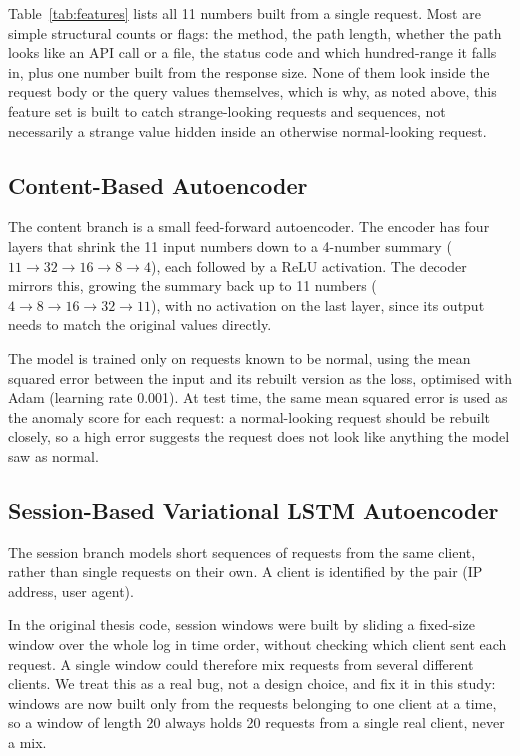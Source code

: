 \documentclass[futureinternet,article,submit,moreauthors]{Definitions/mdpi}
\begin{document}
Table~\ref{tab:features} lists all 11 numbers built from a single request. Most are simple structural counts or flags: the method, the path length, whether the path looks like an API call or a file, the status code and which hundred-range it falls in, plus one number built from the response size. None of them look inside the request body or the query values themselves, which is why, as noted above, this feature set is built to catch strange-looking requests and sequences, not necessarily a strange value hidden inside an otherwise normal-looking request.

\subsection{Content-Based Autoencoder}

The content branch is a small feed-forward autoencoder. The encoder has four layers that shrink the 11 input numbers down to a 4-number summary ($11 \rightarrow 32 \rightarrow 16 \rightarrow 8 \rightarrow 4$), each followed by a ReLU activation. The decoder mirrors this, growing the summary back up to 11 numbers ($4 \rightarrow 8 \rightarrow 16 \rightarrow 32 \rightarrow 11$), with no activation on the last layer, since its output needs to match the original values directly.

The model is trained only on requests known to be normal, using the mean squared error between the input and its rebuilt version as the loss, optimised with Adam (learning rate 0.001). At test time, the same mean squared error is used as the anomaly score for each request: a normal-looking request should be rebuilt closely, so a high error suggests the request does not look like anything the model saw as normal.

\subsection{Session-Based Variational LSTM Autoencoder} \label{sec4.5}

The session branch models short sequences of requests from the same client, rather than single requests on their own. A client is identified by the pair (IP address, user agent).

In the original thesis code, session windows were built by sliding a fixed-size window over the whole log in time order, without checking which client sent each request. A single window could therefore mix requests from several different clients. We treat this as a real bug, not a design choice, and fix it in this study: windows are now built only from the requests belonging to one client at a time, so a window of length 20 always holds 20 requests from a single real client, never a mix.
\end{document}
